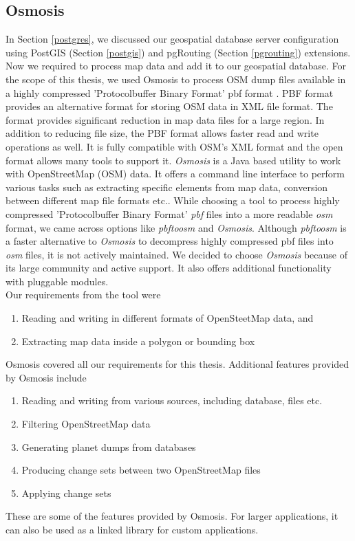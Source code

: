 \subsection{Osmosis} \label{osmosis}
In Section \ref{postgres}, we discussed our geospatial database server configuration using PostGIS (Section \ref{postgis}) and pgRouting (Section \ref{pgrouting}) extensions. Now we required to process map data and add it to our geospatial database. For the scope of this thesis, we used Osmosis to process OSM dump files available in a highly compressed 'Protocolbuffer Binary Format' pbf format \cite{osmpbf}. PBF format provides an alternative format for storing OSM data in XML file format. The format provides significant reduction in map data files for a large region. In addition to reducing file size, the PBF format allows faster read and write operations as well. It is fully compatible with OSM's XML format and the open format allows many tools to support it. \textit{Osmosis} \cite{osmosis} is a Java based utility to work with OpenStreetMap (OSM) data. It offers a command line interface to perform various tasks such as extracting specific elements from map data, conversion between different map file formats etc.. While choosing a tool to process highly compressed 'Protocolbuffer Binary Format' \textit{pbf} files into a more readable \textit{osm} format, we came across options like \textit{pbftoosm} \cite{pbftoosm} and \textit{Osmosis}. Although \textit{pbftoosm} is a faster alternative \cite{pbftoosm} to \textit{Osmosis} to decompress highly compressed pbf files into \textit{osm} files, it is not actively maintained. We decided to choose \textit{Osmosis} because of its large community and active support. It also offers additional functionality with pluggable modules. \\

Our requirements from the tool were
\begin{enumerate}
\item Reading and writing in different formats of OpenSteetMap data, and
\item Extracting map data inside a polygon or bounding box
\end{enumerate}
Osmosis covered all our requirements for this thesis. Additional features provided by Osmosis include \begin{enumerate}
\item Reading and writing from various sources, including database, files etc.
\item Filtering OpenStreetMap data
\item Generating planet dumps from databases
\item Producing change sets between two OpenStreetMap files
\item Applying change sets 
\end{enumerate} 
These are some of the features provided by Osmosis. For larger applications, it can also be used as a linked library for custom applications.\\ 

